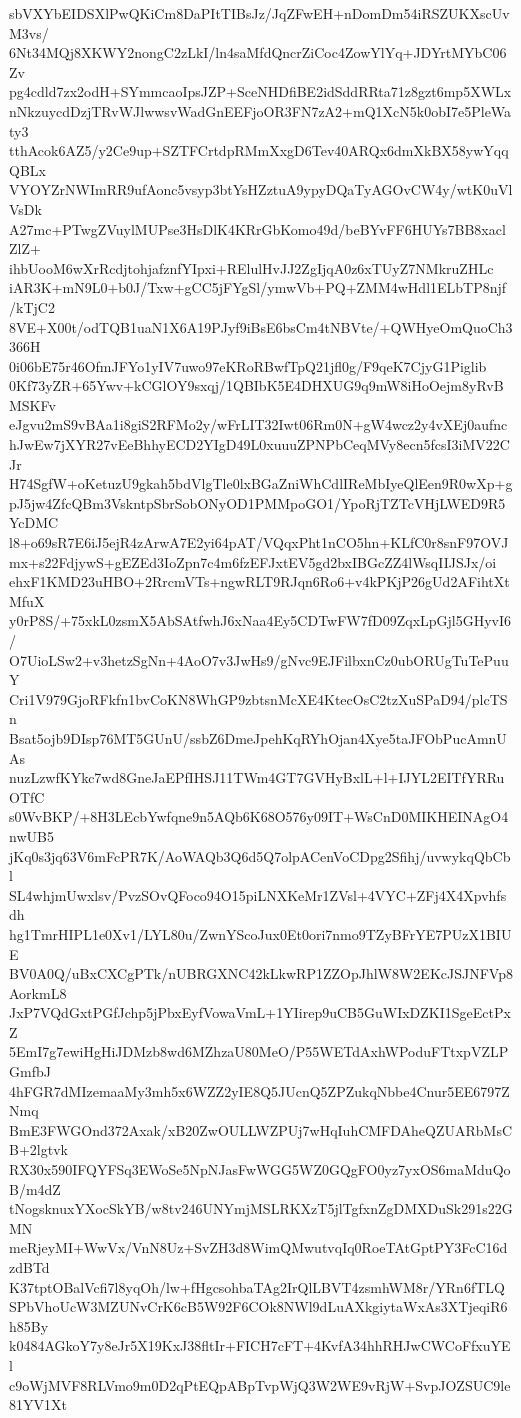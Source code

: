 sbVXYbEIDSXlPwQKiCm8DaPItTIBsJz/JqZFwEH+nDomDm54iRSZUKXscUvM3vs/
6Nt34MQj8XKWY2nongC2zLkI/ln4saMfdQncrZiCoc4ZowYlYq+JDYrtMYbC06Zv
pg4cdld7zx2odH+SYmmcaoIpsJZP+SceNHDfiBE2idSddRRta71z8gzt6mp5XWLx
nNkzuycdDzjTRvWJlwwsvWadGnEEFjoOR3FN7zA2+mQ1XcN5k0obI7e5PleWaty3
tthAcok6AZ5/y2Ce9up+SZTFCrtdpRMmXxgD6Tev40ARQx6dmXkBX58ywYqqQBLx
VYOYZrNWImRR9ufAonc5vsyp3btYsHZztuA9ypyDQaTyAGOvCW4y/wtK0uVlVsDk
A27mc+PTwgZVuylMUPse3HsDlK4KRrGbKomo49d/beBYvFF6HUYs7BB8xaclZlZ+
ihbUooM6wXrRcdjtohjafznfYIpxi+RElulHvJJ2ZgIjqA0z6xTUyZ7NMkruZHLc
iAR3K+mN9L0+b0J/Txw+gCC5jFYgSl/ymwVb+PQ+ZMM4wHdl1ELbTP8njf/kTjC2
8VE+X00t/odTQB1uaN1X6A19PJyf9iBsE6bsCm4tNBVte/+QWHyeOmQuoCh3366H
0i06bE75r46OfmJFYo1yIV7uwo97eKRoRBwfTpQ21jfl0g/F9qeK7CjyG1Piglib
0Kf73yZR+65Ywv+kCGlOY9sxqj/1QBIbK5E4DHXUG9q9mW8iHoOejm8yRvBMSKFv
eJgvu2mS9vBAa1i8giS2RFMo2y/wFrLIT32Iwt06Rm0N+gW4wcz2y4vXEj0aufnc
hJwEw7jXYR27vEeBhhyECD2YIgD49L0xuuuZPNPbCeqMVy8ecn5fcsI3iMV22CJr
H74SgfW+oKetuzU9gkah5bdVlgTle0lxBGaZniWhCdlIReMbIyeQlEen9R0wXp+g
pJ5jw4ZfcQBm3VskntpSbrSobONyOD1PMMpoGO1/YpoRjTZTcVHjLWED9R5YcDMC
l8+o69sR7E6iJ5ejR4zArwA7E2yi64pAT/VQqxPht1nCO5hn+KLfC0r8snF97OVJ
mx+s22FdjywS+gEZEd3IoZpn7c4m6fzEFJxtEV5gd2bxIBGcZZ4lWsqIIJSJx/oi
ehxF1KMD23uHBO+2RrcmVTs+ngwRLT9RJqn6Ro6+v4kPKjP26gUd2AFihtXtMfuX
y0rP8S/+75xkL0zsmX5AbSAtfwhJ6xNaa4Ey5CDTwFW7fD09ZqxLpGjl5GHyvI6/
O7UioLSw2+v3hetzSgNn+4AoO7v3JwHs9/gNvc9EJFilbxnCz0ubORUgTuTePuuY
Cri1V979GjoRFkfn1bvCoKN8WhGP9zbtsnMcXE4KtecOsC2tzXuSPaD94/plcTSn
Bsat5ojb9DIsp76MT5GUnU/ssbZ6DmeJpehKqRYhOjan4Xye5taJFObPucAmnUAs
nuzLzwfKYkc7wd8GneJaEPfIHSJ11TWm4GT7GVHyBxlL+l+IJYL2EITfYRRuOTfC
s0WvBKP/+8H3LEcbYwfqne9n5AQb6K68O576y09IT+WsCnD0MIKHEINAgO4nwUB5
jKq0s3jq63V6mFcPR7K/AoWAQb3Q6d5Q7olpACenVoCDpg2Sfihj/uvwykqQbCbl
SL4whjmUwxlsv/PvzSOvQFoco94O15piLNXKeMr1ZVsl+4VYC+ZFj4X4Xpvhfsdh
hg1TmrHIPL1e0Xv1/LYL80u/ZwnYScoJux0Et0ori7nmo9TZyBFrYE7PUzX1BIUE
BV0A0Q/uBxCXCgPTk/nUBRGXNC42kLkwRP1ZZOpJhlW8W2EKcJSJNFVp8AorkmL8
JxP7VQdGxtPGfJchp5jPbxEyfVowaVmL+1YIirep9uCB5GuWIxDZKI1SgeEctPxZ
5EmI7g7ewiHgHiJDMzb8wd6MZhzaU80MeO/P55WETdAxhWPoduFTtxpVZLPGmfbJ
4hFGR7dMIzemaaMy3mh5x6WZZ2yIE8Q5JUcnQ5ZPZukqNbbe4Cnur5EE6797ZNmq
BmE3FWGOnd372Axak/xB20ZwOULLWZPUj7wHqIuhCMFDAheQZUARbMsCB+2lgtvk
RX30x590IFQYFSq3EWoSe5NpNJasFwWGG5WZ0GQgFO0yz7yxOS6maMduQoB/m4dZ
tNogsknuxYXocSkYB/w8tv246UNYmjMSLRKXzT5jlTgfxnZgDMXDuSk291s22GMN
meRjeyMI+WwVx/VnN8Uz+SvZH3d8WimQMwutvqIq0RoeTAtGptPY3FcC16dzdBTd
K37tptOBalVcfi7l8yqOh/lw+fHgcsohbaTAg2IrQlLBVT4zsmhWM8r/YRn6fTLQ
SPbVhoUcW3MZUNvCrK6cB5W92F6COk8NWl9dLuAXkgiytaWxAs3XTjeqiR6h85By
k0484AGkoY7y8eJr5X19KxJ38fltIr+FICH7cFT+4KvfA34hhRHJwCWCoFfxuYEl
c9oWjMVF8RLVmo9m0D2qPtEQpABpTvpWjQ3W2WE9vRjW+SvpJOZSUC9le81YV1Xt

